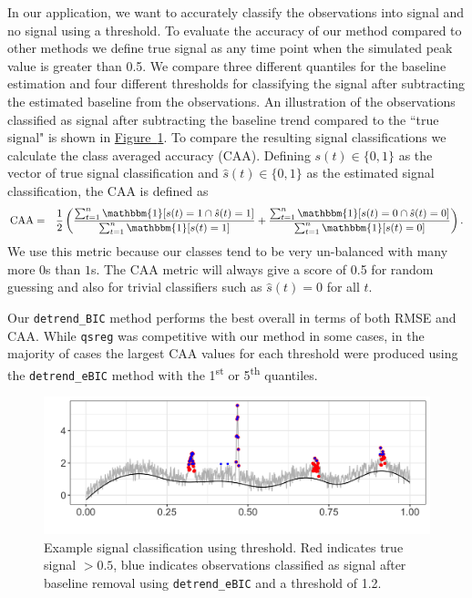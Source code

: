 \documentclass[12pt]{article}
\newcommand{\Fig}[1]{\hyperref[fig:#1]{Figure~\ref*{fig:#1}}} %
\newcommand{\Fig}[1]{{Figure~\ref{fig:#1}}} %
\newcommand{\One}{\mathbbm{1}}
\begin{document}
	In our application, we want to accurately classify the observations into signal and no signal using a threshold. To evaluate the accuracy of our method compared to other methods we define true signal as any time point when the simulated peak value is greater than 0.5. We compare three different quantiles for the baseline estimation and four different thresholds for classifying the signal after subtracting the estimated baseline from the observations.  An illustration of the observations classified as signal after subtracting the baseline trend compared to the ``true signal" is shown in \Fig{peaks_class_eg}. To compare the resulting signal classifications we calculate the class averaged accuracy (CAA). Defining $s(t) \in \{0,1\}$ as the vector of true signal classification and $\hat{s}(t) \in \{0,1\}$ as the estimated signal classification, the CAA is defined as
	\begin{eqnarray*}
	\mbox{CAA} & = & \frac{1}{2}\left(\frac{\sum_{t=1}^n \One[s(t) = 1 \cap \hat{s}(t)=1]}{\sum_{t=1}^n \One[s(t) = 1]} + \frac{\sum_{t=1}^n \One[s(t) = 0 \cap \hat{s}(t)=0]}{\sum_{t=1}^n \One[s(t) = 0]}\right).
	\end{eqnarray*}  
	We use this metric because our classes tend to be very un-balanced with many more $0$s than $1$s. The CAA metric will always give a score of 0.5 for random guessing and also for trivial classifiers such as $\hat{s}(t) = 0$ for all $t$. 

	Our \texttt{detrend\_BIC} method performs the best overall in terms of both RMSE and CAA. While \texttt{qsreg} was competitive with our method in some cases, in the majority of cases the largest CAA values for each threshold were produced using the \texttt{detrend\_eBIC} method with the 1\textsuperscript{st} or 5\textsuperscript{th} quantiles. 
	
	\begin{figure}[h!]
		\includegraphics[width = \linewidth]{Figures/peaks_eg_class.png}
		\caption{Example signal classification using threshold. Red indicates true signal $>0.5$, blue indicates observations classified as signal after baseline removal using \texttt{detrend\_eBIC} and a threshold of 1.2.}
		\label{fig:peaks_class_eg}
	\end{figure}
	
\end{document}
